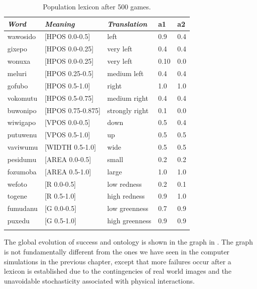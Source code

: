 \begin{table}
\begin{center}
\begin{tabular}{ l  l  l  l  l }
\lsptoprule
{\itshape Word}&{\itshape Meaning}&{\itshape Translation} & {\bfshape a1}&{\bfshape a2} \\ \midrule
wawosido & [HPOS 0.0-0.5] &left&0.9&0.4\\ 
gixepo & [HPOS 0.0-0.25] & very left&0.4&0.4\\ 
wonuxa & [HPOS 0.0-0.25] & very left&0.10&0.0\\ 
meluri & [HPOS 0.25-0.5] &medium left&0.4&0.4\\ 
gofubo & [HPOS 0.5-1.0]& right&1.0&1.0\\ 
vokomutu & [HPOS 0.5-0.75] &medium right&0.4&0.4\\ 
buwonipo & [HPOS 0.75-0.875] &strongly right&0.1&0.0\\ 
wiwigapo & [VPOS 0.0-0.5] &down&0.5&0.4\\ 
putuwenu & [VPOS 0.5-1.0]&up & 0.5&0.5\\ 
vaviwumu & [WIDTH 0.5-1.0]&wide & 0.5&0.5\\ 
pesidumu & [AREA 0.0-0.5]&small& 0.2&0.2\\ 
fozumoba & [AREA 0.5-1.0]&large & 1.0&1.0\\ 
wefoto & [R 0.0-0.5]& low redness &0.2&0.1\\ 
togene & [R 0.5-1.0]& high redness &0.9&1.0\\ 
fumudanu & [G 0.0-0.5]& low greenness &0.7&0.9\\ 
puxedu & [G 0.5-1.0]& high greenness &0.9&0.9\\ 
\lspbottomrule
\end{tabular}
\caption{ \label{tab:puxedu} Population lexicon after 500 games.}
\end{center}
\end{table}
The global evolution of success and ontology is shown in the 
graph in . The graph is not 
fundamentally different from the ones we have
seen in the computer simulations in the previous
chapter, except that more failures occur after a lexicon
is established due to the contingencies of real 
world images and the unavoidable stochasticity 
associated with physical interactions. 

